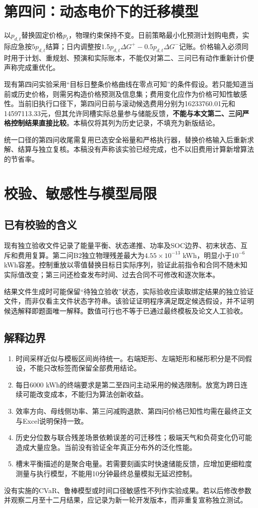 \documentclass[UTF8,a4paper,zihao=-4,fontset=fandol]{ctexart}
\begin{document}
\section{第四问：动态电价下的迁移模型}
以$p_{d,t}$替换固定价格$p_t$，物理约束保持不变。日前策略最小化预测计划购电费，实际应急按$5p_{d,t}$结算；日内调整按$1.5p_{d,t}\Delta G^+-0.5p_{d,t}\Delta G^-$记账。价格输入必须同时用于计划、重规划、预演和实际账本，不能仅对第二、三问已有动作重新计价便声称完成重优化。

现有第四问实验采用“目标日整条价格曲线在零点可知”的条件假设。若只能知道当前或历史价格，则需另构造价格预测及信息集；费用变化应作为价格可知性敏感性。当前旧执行口径下，第四问日前与滚动候选费用分别为16233760.01元和14597113.33元，但其允许同槽实际总量参与储能反馈，\textbf{不能与本文第二、三问严格控制结果直接比较}。本稿仅将其列为历史记录，不填充为新版结论。

统一口径的第四问收尾需复用已选安全裕量和严格执行器，替换价格输入后重新求解、结算与独立复核。本稿没有声称该实验已经完成，也不以旧费用计算新增算法的节省率。

\section{校验、敏感性与模型局限}
\subsection{已有校验的含义}
现有独立验收文件记录了能量平衡、状态递推、功率及SOC边界、初末状态、互斥和费用复算。第二问B2独立物理残差最大为$4.55\times10^{-13}$ kWh，明显小于$10^{-6}$ kWh容差。控制重放以零值替换目标日实际序列，验证此前指令和合同不随未知实际值改变；第三问还检查发布时间、过去合同不可修改和逐次账本。

结果文件生成时可能保留“待独立验收”状态，实际验收应读取绑定结果的独立验证文件，而非仅看主文件状态字符串。该验证证明程序满足既定候选假设，并不证明候选解释即题面唯一解释。数值可行也不等于已通过最终模板及论文人工验收。

\subsection{解释边界}
\begin{enumerate}
\item 时间采样近似与模板区间尚待统一。右端矩形、左端矩形和梯形积分是不同假设，不能只改标签而保留全部费用结论。
\item 每日6000 kWh的终端要求是第二至四问主动采用的候选限制。放宽为跨日连续可能改变成本，不能归为算法创新收益。
\item 效率方向、母线侧功率、第三问减购退款、第四问价格已知性均需在最终正文与Excel说明保持一致。
\item 历史分位数与联合残差场景依赖误差的可迁移性；极端天气和负荷变化仍可能造成大量应急。当前没有验证全年真正分布外的泛化性能。
\item 槽末平衡描述的是聚合电量。若需要刻画实时快速储能反馈，应增加更细粒度测量与执行模型，不能用10分钟最终总量模拟无延迟控制。
\end{enumerate}
没有实施的CVaR、鲁棒模型或时间口径敏感性不列作实验成果。若以后修改参数并观察二月至十二月结果，应记录为新一轮开发版本，而非重复宣称独立测试。
\end{document}
